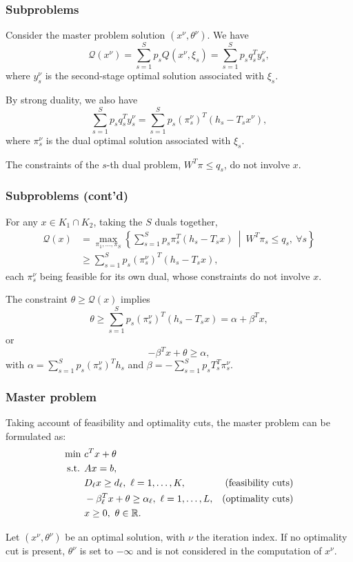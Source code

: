 \documentclass[aspectratio=169]{beamer}
\begin{document}
\begin{frame}
\frametitle{Subproblems}
	
Consider the master problem solution $(x^{\nu}, \theta^{\nu})$. We have
\[
\mathcal{Q}(x^{\nu}) = \sum_{s=1}^S p_s Q(x^{\nu}, \xi_s) = \sum_{s=1}^S p_s q_s^T y_s^{\nu},
\]
where $y_s^{\nu}$ is the second-stage optimal solution associated with $\xi_s$.
	
\mbox{}

By strong duality, we also have	
\[
\sum_{s=1}^S p_s q_s^T y_s^{\nu} = \sum_{s=1}^S p_s (\pi_s^{\nu})^T(h_s - T_sx^{\nu}),
\]
where $\pi_s^{\nu}$ is the dual optimal solution associated with $\xi_s$.
	
\mbox{}
	
The constraints of the $s$-th dual problem, $W^T\pi \leq q_s$, do not involve $x$.
	
\end{frame}

\begin{frame}
\frametitle{Subproblems (cont'd)}
\small

For any $x \in K_1 \cap K_2$, taking the $S$ duals together,
\begin{align*}
\mathcal{Q}(x) &= \max_{\pi_1, \ldots, \pi_S} \left\lbrace \sum_{s=1}^S p_s \pi_s^T(h_s - T_sx)
\ \middle|\ W^T\pi_s \leq q_s,\ \forall s \right\rbrace \\
& \geq \sum_{s=1}^S p_s(\pi_s^{\nu})^T(h_s - T_sx),
\end{align*}
each $\pi_s^{\nu}$ being feasible for its own dual, whose constraints do not involve $x$.

The constraint $\theta \geq \mathcal{Q}(x)$ implies
\[
\theta \geq \sum_{s=1}^S p_s(\pi_s^{\nu})^T(h_s - T_sx) = \alpha + \beta^Tx,
\]
or
\[
-\beta^Tx + \theta \geq \alpha,
\]
with $\alpha = \sum_{s=1}^S p_s(\pi_s^{\nu})^Th_s$ and
$\beta = -\sum_{s=1}^S p_s T_s^T \pi_s^{\nu}$.
	
\end{frame}

\begin{frame}
\frametitle{Master problem}

Taking account of feasibility and optimality cuts, the master problem can be formulated as:
\begin{align*}
\min\ & c^Tx + \theta \\
\text{s.t. } & Ax = b, \\
& D_{\ell} x \geq d_{\ell},\ \ell = 1,\ldots,K, & \text{(feasibility cuts)} \\
& -\beta_{\ell}^Tx + \theta \geq \alpha_{\ell},\ \ell = 1,\ldots,L, & \text{(optimality cuts)}\\
& x \geq 0,\ \theta \in {\mathbb{R}}.
\end{align*}
	
\mbox{}

Let $(x^{\nu}, \theta^{\nu})$ be an optimal solution, with $\nu$ the iteration index.
If no optimality cut is present, $\theta^{\nu}$ is set to $-\infty$ and is not considered in the computation of $x^{\nu}$.

\end{frame}
\end{document}
